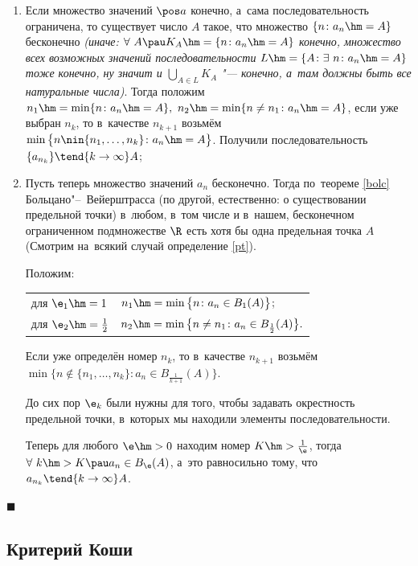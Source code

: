 \documentclass[a4paper,10pt,twoside]{article}
\newenvironment{Proof}
       {\par\noindent{\textbf{Доказательство.}}}
       {\hfill$\scriptstyle\blacksquare$}
\begin{document}
\begin{Proof}

\begin{enumerate}
    \item Если множество значений $\pos a$ конечно, а~сама последовательность ограничена, то существует число $A$ такое, что множество
        $\{n\colon a_n\hm=A\}$ бесконечно \textit{(иначе: $\forall\  A \pau K_A\hm=\{n\colon a_n\hm=A\}$ конечно, множество всех возможных значений последовательности $L\hm=\{A\colon \exists\  n\colon a_n\hm=A\}$ тоже конечно, ну значит и  $\bigcup\limits_{A\in L}
    K_A$ "--- конечно, а~там должны быть все натуральные числа)}. Тогда положим $n_1\hm=\min\{n\colon a_n\hm=A\},\ n_2\hm=\min\{n\neq n_1\colon a_n\hm=A\}$, если уже выбран $n_k$, то в~качестве $n_{k+1}$
    возьмём $\min\big\{n\nin\{n_1,\ldots,n_k\}\colon a_n\hm=A\big\}$. Получили последовательность $\{a_{n_k}\}\tend{k\to \infty}A$;

    \item Пусть теперь множество значений $a_n$ бесконечно. Тогда по~теореме \ref{bolc} Больцано"--~Вейерштрасса (по другой, естественно:
     о существовании предельной точки) в~любом, в~том числе и в~нашем, бесконечном ограниченном подмножестве $\R$ есть хотя бы одна предельная точка $A$ (Смотрим на~всякий случай определение \ref{pt}).

        Положим:

        \begin{tabular}{ll}
            для $\e_1\hm=1$&$n_1\hm=\min\big\{n\colon a_n\in B_1(A)\big\}$;\\
            для $\e_2\hm=\frac12$&$n_2\hm=\min\big\{n\neq n_1\colon a_n\in B_{\frac12}(A)\big\}.$
        \end{tabular}

        Если уже определён номер $n_k$, то в~качестве $n_{k+1}$ возьмём $\min\big\{n\nin\{n_1,\ldots,n_k\}\colon
        a_n\in B_{\frac1{k+1}}(A)\big\}$.

        До сих пор $\e_k$ были нужны для того, чтобы задавать окрестность предельной точки, в~которых мы находили элементы последовательности.

        Теперь для любого $\e\hm>0$ находим номер $K\hm>\frac1\e$, тогда
        $\forall\  k\hm>K\pau a_n\in B_\e(A)$, а~это равносильно тому, что $a_{n_k}\tend{k\to\infty}A$.
\end{enumerate}
\end{Proof}

\subsection{Критерий Коши}
\end{document}
